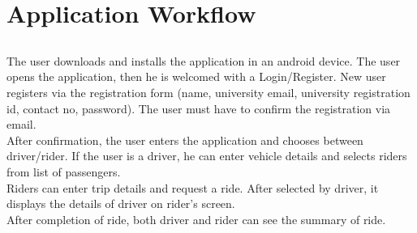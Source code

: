 \chapter{Application Workflow} \label{ap:Appendix1}

\section*{}
The user downloads and installs the application in an android device. The user opens the application, then he is welcomed with a Login/Register. New user registers via the registration form (name, university email, university registration id, contact no, password). The user must have to confirm the registration via email.\\

After confirmation, the user enters the application and chooses between driver/rider. If the user is a driver, he can enter vehicle details and selects riders from list of passengers.\\

Riders can enter trip details and request a ride. After selected by driver, it displays the details of driver on rider's screen.\\

After completion of ride, both driver and rider can see the summary of ride.


